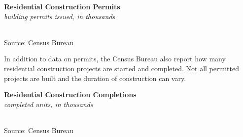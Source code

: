 \documentclass{report}
\makeatletter
\newcommand{\tbllink}[1]{\href{https://raw.githubusercontent.com/bdecon/US-chartbook/master/chartbook/data/#1}{\faTable}}
\newcommand*\short[1]{\expandafter\@gobbletwo\number\numexpr#1\relax}
\newcommand{\dateaxisticks}{
		date coordinates in=x, axis line style={draw=none},
		xmax={2022-01-30},
		max space between ticks=40,	    
		xtick={{1990-01-01}, {1992-01-01}, {1994-01-01}, 
			{1996-01-01}, {1998-01-01}, {2000-01-01}, 
			{2002-01-01}, {2004-01-01}, {2006-01-01},
			{2008-01-01}, {2010-01-01}, {2012-01-01}, {2014-01-01},
		    {2016-01-01}, {2018-01-01}, {2020-01-01}, {2022-01-01}},
		minor xtick={{1989-01-01}, {1991-01-01}, {1993-01-01},
			{1995-01-01}, {1997-01-01}, {1999-01-01}, 
			{2001-01-01}, {2003-01-01}, {2005-01-01}, {2007-01-01},
		    {2009-01-01}, {2011-01-01}, {2013-01-01}, {2015-01-01},
		    {2017-01-01}, {2019-01-01}, {2021-01-01}},
		enlarge y limits={0.06}, enlarge x limits={0.01},
		}
\newcommand{\bbar}[2]{extra #1 ticks = {{#2}}, extra #1 tick labels = ,
		extra #1 tick style = {grid=major, grid style={thick, black!25}},}
\newcommand{\stdline}[4]{\addplot[very thick, no markers, color=#1] 
		table [x=#2, y=#3, col sep=comma] {#4};	}
\newcommand{\rbars}{
		\fill[color=black!10] (axis cs:{1990-07-01},\pgfkeysvalueof{/pgfplots/ymin}) rectangle 
			(axis cs:{1991-03-01}, \pgfkeysvalueof{/pgfplots/ymax});
		\fill[color=black!10] (axis cs:{2007-12-01},\pgfkeysvalueof{/pgfplots/ymin}) rectangle 
			(axis cs:{2009-07-01}, \pgfkeysvalueof{/pgfplots/ymax});
		\fill[color=black!10] (axis cs:{2001-03-01},\pgfkeysvalueof{/pgfplots/ymin}) rectangle 
			(axis cs:{2001-11-01}, \pgfkeysvalueof{/pgfplots/ymax});
		\fill[color=black!10] (axis cs:{2020-02-01},\pgfkeysvalueof{/pgfplots/ymin}) rectangle 
			(axis cs:{2020-05-01}, \pgfkeysvalueof{/pgfplots/ymax});}
\makeatother
\begin{document}
{\begin{minipage}{0.76\textwidth}
\normalsize{\textbf{Residential Construction Permits}}\\
\footnotesize{\textit{building permits issued, in thousands}}\\
\hspace*{-2mm} \\
\footnotesize{Source: Census Bureau} \hfill \tbllink{permits_total.csv}

\vspace{2mm}

\small In addition to data on permits, the Census Bureau also report how many residential construction projects are started and completed. Not all permitted projects are built and the duration of construction can vary. 
\vspace{1mm}

\normalsize{\textbf{Residential Construction Completions}}\\
\footnotesize{\textit{completed units, in thousands}}\\
\hspace*{-2mm} \\
\footnotesize{Source: Census Bureau} \hfill \tbllink{permits_total.csv}
\vspace{4mm}

\small 
\vspace{1mm}


\end{minipage}}
\end{document}
